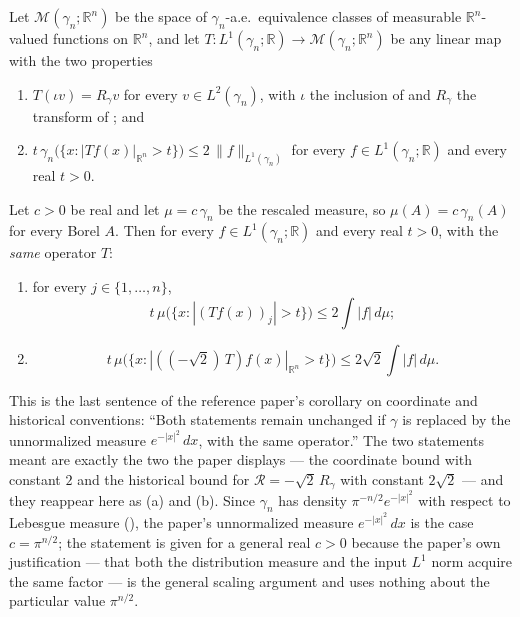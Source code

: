 \begin{corollary}
Let $\mathcal{M}(\gamma_n;\mathbb{R}^n)$ be the space of $\gamma_n$-a.e.\
equivalence classes of measurable $\mathbb{R}^n$-valued functions on
$\mathbb{R}^n$, and let
$T : L^1(\gamma_n;\mathbb{R}) \to \mathcal{M}(\gamma_n;\mathbb{R}^n)$ be any
linear map with the two properties
\begin{enumerate}
\item $T(\iota v) = R_\gamma v$ for every $v \in L^2(\gamma_n)$, with $\iota$ the
inclusion of \noderef{ToL1} and $R_\gamma$ the transform of
; and
\item $t\,\gamma_n\bigl(\{x : |Tf(x)|_{\mathbb{R}^n} > t\}\bigr)
       \leq 2\,\|f\|_{L^1(\gamma_n)}$
for every $f \in L^1(\gamma_n;\mathbb{R})$ and every real $t > 0$.
\end{enumerate}
Let $c > 0$ be real and let $\mu = c\,\gamma_n$ be the rescaled measure, so
$\mu(A) = c\,\gamma_n(A)$ for every Borel $A$.  Then for every
$f \in L^1(\gamma_n;\mathbb{R})$ and every real $t > 0$, with the \emph{same}
operator $T$:
\begin{enumerate}
\item[(a)] for every $j \in \{1,\ldots,n\}$,
\[
  t\,\mu\bigl(\{x : |(Tf(x))_j| > t\}\bigr) \leq 2 \int |f| \, d\mu ;
\]
\item[(b)]
\[
  t\,\mu\bigl(\{x : |((-\sqrt2)\,T)f(x)|_{\mathbb{R}^n} > t\}\bigr)
    \leq 2\sqrt2 \int |f| \, d\mu .
\]
\end{enumerate}

This is the last sentence of the reference paper's corollary on coordinate and
historical conventions: ``Both statements remain unchanged if $\gamma$ is
replaced by the unnormalized measure $e^{-|x|^2}\,dx$, with the same operator.''
The two statements meant are exactly the two the paper displays --- the
coordinate bound with constant $2$ and the historical bound for
$\mathcal{R} = -\sqrt2\,R_\gamma$ with constant $2\sqrt2$ --- and they reappear
here as (a) and (b).  Since $\gamma_n$ has density $\pi^{-n/2}e^{-|x|^2}$ with
respect to Lebesgue measure (\noderef{GaussMeasure}), the paper's unnormalized
measure $e^{-|x|^2}\,dx$ is the case $c = \pi^{n/2}$; the statement is given for
a general real $c > 0$ because the paper's own justification --- that both the
distribution measure and the input $L^1$ norm acquire the same factor --- is the
general scaling argument and uses nothing about the particular value
$\pi^{n/2}$.


\end{corollary}
